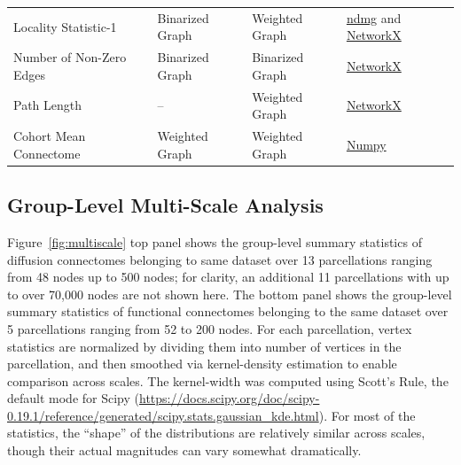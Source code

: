 \documentclass[11pt]{article}
\begin{document}
\begin{table}[h]
{\begin{tabular}{ l l l l }
Locality Statistic-1 & Binarized Graph & Weighted Graph & {\color{blue} \href{https://github.com/neurodata/ndmg/blob/master/ndmg/stats/qa_graphs.py#L151}{ndmg} and \href{https://networkx.github.io/documentation/networkx-1.10/reference/generated/networkx.generators.ego.ego_graph.html}{NetworkX} }\\
Number of Non-Zero Edges & Binarized Graph & Binarized Graph & {\color{blue} \href{https://networkx.github.io/documentation/networkx-1.10/reference/generated/networkx.classes.function.edges.html#networkx.classes.function.edges}{NetworkX} }\\
Path Length & -- & Weighted Graph & {\color{blue} \href{https://networkx.github.io/documentation/networkx-1.10/reference/generated/networkx.algorithms.shortest_paths.weighted.all_pairs_dijkstra_path_length.html#networkx.algorithms.shortest_paths.weighted.all_pairs_dijkstra_path_length}{NetworkX} }\\
Cohort Mean Connectome & Weighted Graph & Weighted Graph & {\color{blue} \href{https://docs.scipy.org/doc/numpy/reference/generated/numpy.mean.html}{Numpy} }
\end{tabular} }
\end{table}


\subsection{Group-Level Multi-Scale Analysis}
\label{app:multi}

Figure~\ref{fig:multiscale} top panel shows the group-level summary statistics of diffusion connectomes belonging to same dataset over 13 parcellations ranging from 48 nodes up to 500 nodes; for clarity, an additional 11 parcellations with up to over 70,000 nodes are not shown here. The bottom panel shows the group-level summary statistics of functional connectomes belonging to the same dataset over 5 parcellations ranging from 52 to 200 nodes. 
For each parcellation, vertex statistics are normalized by dividing them into number of vertices in the parcellation, and then smoothed via kernel-density estimation to enable comparison across scales. The kernel-width was computed using Scott's Rule, the default mode for Scipy (\url{https://docs.scipy.org/doc/scipy-0.19.1/reference/generated/scipy.stats.gaussian_kde.html}).
For most of the statistics, the ``shape'' of the distributions  are relatively similar across scales, though their actual magnitudes can vary somewhat dramatically.
\end{document}
